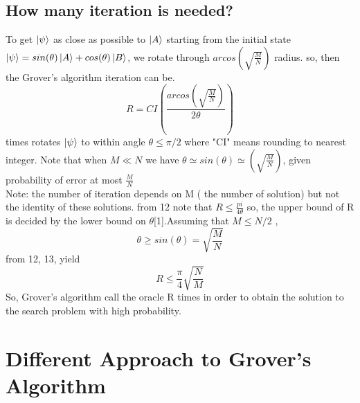 \documentclass[11pt]{article}
\begin{document}
\subsection{How many iteration is needed?}
To get $\ket{\psi}$ as close as possible to $\ket{A}$ starting from the initial state $\ket{\psi}= sin(\theta)\ket{A}+cos(\theta)\ket{B}$, we rotate through $arcos(\sqrt{\frac{M}{N}})$ radius. so, then the Grover's algorithm iteration can be. 
\begin{equation}
R = CI(\frac{arcos(\sqrt{\frac{M}{N}})}{2\theta})
\end{equation} 
times rotates $\ket{\psi}$ to within angle $\theta \leq \pi/2 $ where "CI" means rounding to nearest integer. Note that when $M\ll N$ we have $\theta \simeq sin(\theta) \simeq (\sqrt{\frac{M}{N}})$, given probability of error at most $\frac{M}{N}$\\
Note: the number of iteration depends on M ( the number of solution) but not the identity of these solutions. from 12 note that $R \leq \frac{pi}{4\theta}$ so, the upper bound of R is decided by the lower bound on $\theta$[1].Assuming that $M \leq N/2$ \cite{Nielsen:2011:QCQ:1972505},
\begin{equation}
\theta \geq sin(\theta)= \sqrt{\frac{M}{N}}
\end{equation}
from 12, 13, yield
\begin{equation}
R \leq \frac{\pi}{4}\sqrt{\frac{N}{M}}
\end{equation}
So, Grover's algorithm call the oracle R times in order to obtain the solution to the search problem with high probability. 
\section{Different Approach to Grover's Algorithm}
\end{document}
